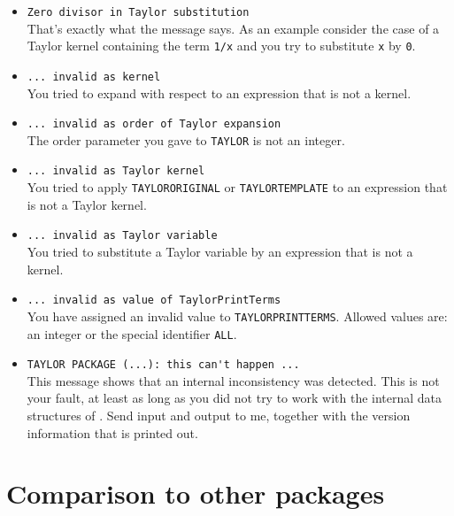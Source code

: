 \begin{itemize}
\item \verb|Zero divisor in Taylor substitution|\\
    That's exactly what the message says.  As an example consider the
    case of a Taylor kernel containing the term \verb|1/x| and you try
    to substitute \verb|x| by \verb|0|.

\item \verb|... invalid as kernel|\\
    You tried to expand with respect to an expression that is not a
    kernel.

\item \verb|... invalid as order of Taylor expansion|\\
    The order parameter you gave to \verb|TAYLOR| is not an integer.

\item \verb|... invalid as Taylor kernel|\\
 
    You tried to apply \verb|TAYLORORIGINAL| or \verb|TAYLORTEMPLATE|
    to an expression that is not a Taylor kernel.

\item \verb|... invalid as Taylor variable|\\
    You tried to substitute a Taylor variable by an expression that is
    not a kernel.

\item \verb|... invalid as value of TaylorPrintTerms|\\
    You have assigned an invalid value to \verb|TAYLORPRINTTERMS|.
    Allowed values are: an integer or the special identifier
    \verb|ALL|.

\item \verb|TAYLOR PACKAGE (...): this can't happen ...|\\
    This message shows that an internal inconsistency was detected.
    This is not your fault, at least as long as you did not try to
    work with the internal data structures of \REDUCE. Send input
    and output to me, together with the version information that is
    printed out.

\end{itemize}

\section{Comparison to other packages}

